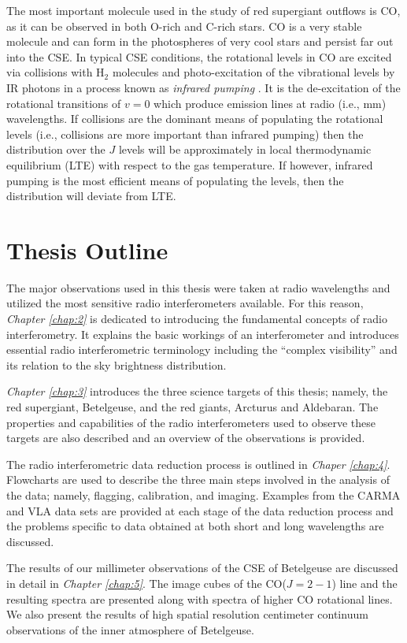 The most important molecule used in the study of red supergiant outflows is CO, as it can be observed in both O-rich and C-rich stars. CO is a very stable molecule and can form in the photospheres of very cool stars and persist far out into the CSE. In typical CSE conditions, the rotational levels in CO are excited via collisions with H$_{2}$ molecules and photo-excitation of the vibrational levels by IR photons in a process known as \textit{infrared pumping} \citep{lamers_1999}. It is the de-excitation of the rotational transitions of $v=0$ which produce emission lines at radio (i.e., mm) wavelengths. If collisions are the dominant means of populating the rotational levels (i.e., collisions are more important than infrared pumping) then the distribution over the $J$ levels will be approximately in local thermodynamic equilibrium (LTE) with respect to the gas temperature. If however, infrared pumping is the most efficient means of populating the levels, then the distribution will deviate from LTE. 

\section{Thesis Outline}
The major observations used in this thesis were taken at radio wavelengths and utilized the most sensitive radio interferometers available. For this reason, \textit{Chapter \ref{chap:2}} is dedicated to introducing the fundamental concepts of radio interferometry. It explains the basic workings of an interferometer and introduces essential radio interferometric  terminology including the ``complex visibility'' and its relation to the sky brightness distribution.

\textit{Chapter \ref{chap:3}} introduces the three science targets of this thesis; namely, the red supergiant, Betelgeuse, and the red giants, Arcturus and Aldebaran. The properties and capabilities of the radio interferometers used to observe these targets are also described and an overview of the observations is provided.

The radio interferometric data reduction process is outlined in \textit{Chaper \ref{chap:4}}. Flowcharts are used to describe the three main steps involved in the analysis of the data; namely, flagging, calibration, and imaging. Examples from the CARMA and VLA data sets are provided at each stage of the data reduction process and the problems specific to data obtained at both short and long wavelengths are discussed. 

The results of our millimeter observations of the CSE of Betelgeuse are discussed in detail in \textit{Chapter \ref{chap:5}}. The image cubes of the CO($J=2-1$) line and the resulting spectra are presented along with spectra of higher CO rotational lines. We also present the results of high spatial resolution centimeter continuum observations of the inner atmosphere of Betelgeuse.

